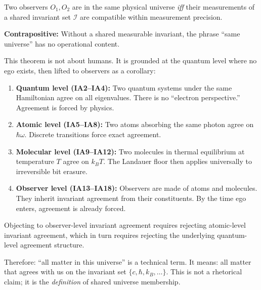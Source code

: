 \begin{theorem}\label{thm:universe-membership}
Two observers $O_1, O_2$ are in the same physical universe \emph{iff} their
measurements of a shared invariant set $\mathcal{I}$ are compatible within
measurement precision.

\textbf{Contrapositive:} Without a shared measurable invariant, the phrase
``same universe'' has no operational content.
\end{theorem}

This theorem is not about humans. It is grounded at the quantum level where
no ego exists, then lifted to observers as a corollary:

\begin{enumerate}
\item \textbf{Quantum level (IA2--IA4):} Two quantum systems under the same
  Hamiltonian agree on all eigenvalues. There is no ``electron perspective.''
  Agreement is forced by physics.

\item \textbf{Atomic level (IA5--IA8):} Two atoms absorbing the same photon
  agree on $\hbar\omega$. Discrete transitions force exact agreement.

\item \textbf{Molecular level (IA9--IA12):} Two molecules in thermal equilibrium
  at temperature $T$ agree on $k_B T$. The Landauer floor then applies
  universally to irreversible bit erasure.

\item \textbf{Observer level (IA13--IA18):} Observers are made of atoms and
  molecules. They inherit invariant agreement from their constituents.
  By the time ego enters, agreement is already forced.
\end{enumerate}

\begin{corollary}\label{cor:ego-trap}
Objecting to observer-level invariant agreement requires rejecting atomic-level
invariant agreement, which in turn requires rejecting the underlying quantum-level agreement structure.
\end{corollary}

Therefore: ``all matter in this universe'' is a technical term. It means:
all matter that agrees with us on the invariant set $\{c, \hbar, k_B, \ldots\}$.
This is not a rhetorical claim; it is the \emph{definition} of shared universe membership.
